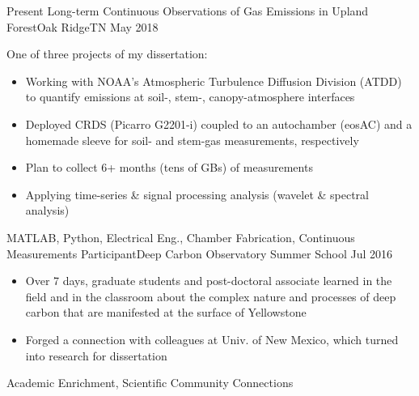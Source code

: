%
%
%

\begin{experiences}
  \experience
    {Present}       {Long-term Continuous Observations of Gas Emissions in Upland Forest}{Oak Ridge}{TN}
    {May 2018}      {
                    One of three projects of my dissertation:
                      \begin{itemize}
                        \item Working with NOAA’s Atmospheric Turbulence Diffusion Division (ATDD) to quantify  emissions at soil-, stem-, canopy-atmosphere interfaces                        
                        \item Deployed CRDS (Picarro G2201-i) coupled to an autochamber (eosAC) and a homemade sleeve for soil- and stem-gas measurements, respectively
                        \item Plan to collect 6+ months (tens of GBs) of measurements               
                        \item Applying time-series \& signal processing analysis (wavelet \& spectral analysis)     
                      \end{itemize}
                    }
                    {MATLAB, Python, Electrical Eng., Chamber Fabrication, Continuous Measurements}
  \emptySeparator
    \experience
    {Participant}{Deep Carbon Observatory Summer School}
	{Jul 2016}	{                
	                \begin{itemize}
	                \item Over 7 days, graduate students and post-doctoral associate learned in the field and in the classroom about the complex nature and processes of deep carbon that are manifested at the surface of Yellowstone
	                \item Forged a connection with colleagues at Univ. of New Mexico, which turned into research for dissertation
	                \end{itemize}
	            }
	            {Academic Enrichment, Scientific Community Connections}
\end{experiences}
